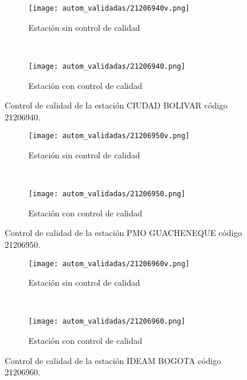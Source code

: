 \begin{figure}[H]
\begin{subfigure}[b]{0.5\textwidth}
\begin{center}
\texttt{[image: autom\_validadas/21206940v.png]}
\caption{Estación sin control de calidad}
        \end{center}
\end{subfigure}
~
\begin{subfigure}[b]{0.5\textwidth}
\begin{center}
\texttt{[image: autom\_validadas/21206940.png]}
\caption{Estación con control de calidad}
\end{center}    
\end{subfigure}
\caption{Control de calidad de la estación CIUDAD BOLIVAR código 21206940.}
\end{figure}    
  
\begin{figure}[H]
\begin{subfigure}[b]{0.5\textwidth}
\begin{center}
\texttt{[image: autom\_validadas/21206950v.png]}
\caption{Estación sin control de calidad}
        \end{center}
\end{subfigure}
~
\begin{subfigure}[b]{0.5\textwidth}
\begin{center}
\texttt{[image: autom\_validadas/21206950.png]}
\caption{Estación con control de calidad}
\end{center}    
\end{subfigure}
\caption{Control de calidad de la estación PMO GUACHENEQUE código 21206950.}
\end{figure}    
  
\begin{figure}[H]
\begin{subfigure}[b]{0.5\textwidth}
\begin{center}
\texttt{[image: autom\_validadas/21206960v.png]}
\caption{Estación sin control de calidad}
        \end{center}
\end{subfigure}
~
\begin{subfigure}[b]{0.5\textwidth}
\begin{center}
\texttt{[image: autom\_validadas/21206960.png]}
\caption{Estación con control de calidad}
\end{center}    
\end{subfigure}
\caption{Control de calidad de la estación IDEAM BOGOTA código 21206960.}
\end{figure}    
  
